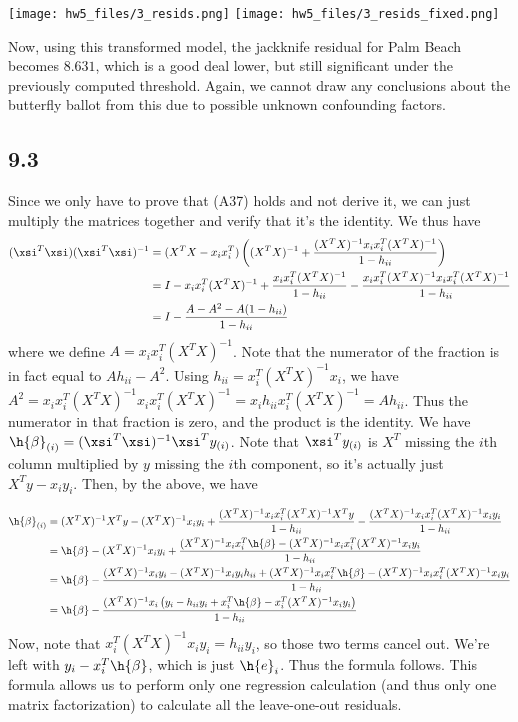 \documentclass{article}
\begin{document}
\texttt{[image: hw5\_files/3\_resids.png]}
\texttt{[image: hw5\_files/3\_resids\_fixed.png]}

Now, using this transformed model, the jackknife residual for Palm Beach becomes $8.631$, which is a good deal lower, but still significant under the previously computed threshold. Again, we cannot draw any conclusions about the butterfly ballot from this due to possible unknown confounding factors.
\subsection*{9.3}
Since we only have to prove that (A37) holds and not derive it, we can just multiply the matrices together and verify that it's the identity. We thus have
\begin{align*}
    (\xsi^T\xsi)(\xsi^T\xsi)^{-1}&=(X^TX-x_ix_i^T)\left((X^TX)^{-1}+\frac{(X^TX)^{-1}x_ix_i^T(X^TX)^{-1}}{1-h_{ii}}\right)\\
                                 &=I-x_ix_i^T(X^TX)^{-1}+\frac{x_ix_i^T(X^TX)^{-1}}{1-h_{ii}}-\frac{x_ix_i^T(X^TX)^{-1}x_ix_i^T(X^TX)^{-1}}{1-h_{ii}}\\
                                 &=I-\frac{A-A^2-A(1-h_{ii})}{1-h_{ii}}\\
\end{align*}
where we define $A=x_ix_i^T(X^TX)^{-1}$. Note that the numerator of the fraction is in fact equal to $Ah_{ii}-A^2$. Using $h_{ii}=x_i^T(X^TX)^{-1}x_i$, we have $A^2=x_ix_i^T(X^TX)^{-1}x_ix_i^T(X^TX)^{-1}=x_ih_{ii}x_i^T(X^TX)^{-1}=Ah_{ii}$. Thus the numerator in that fraction is zero, and the product is the identity.
We have $\h{\beta}_{(i)}=(\xsi^T\xsi)^{-1}\xsi^Ty_{(i)}$. Note that $\xsi^Ty_{(i)}$ is $X^T$ missing the $i$th column multiplied by $y$ missing the $i$th component, so it's actually just $X^Ty-x_iy_i$. Then, by the above, we have 

\begin{align*}
    \h{\beta}_{(i)}&=(X^TX)^{-1}X^Ty-(X^TX)^{-1}x_iy_i+\frac{(X^TX)^{-1}x_ix_i^T(X^TX)^{-1}X^Ty}{1-h_{ii}}-\frac{(X^TX)^{-1}x_ix_i^T(X^TX)^{-1}x_iy_i}{1-h_{ii}}\\
             &=\h{\beta}-(X^TX)^{-1}x_iy_i+\frac{(X^TX)^{-1}x_ix_i^T\h{\beta}-(X^TX)^{-1}x_ix_i^T(X^TX)^{-1}x_iy_i}{1-h_{ii}}\\
             &=\h{\beta}-\frac{(X^TX)^{-1}x_iy_i-(X^TX)^{-1}x_iy_ih_{ii}+(X^TX)^{-1}x_ix_i^T\h{\beta}-(X^TX)^{-1}x_ix_i^T(X^TX)^{-1}x_iy_i}{1-h_{ii}}\\
             &=\h{\beta}-\frac{(X^TX)^{-1}x_i\left(y_i-h_{ii}y_i+x_i^T\h{\beta}-x_i^T(X^TX)^{-1}x_iy_i\right)}{1-h_{ii}}\\
\end{align*}
Now, note that $x_i^T(X^TX)^{-1}x_iy_i=h_{ii}y_i$, so those two terms cancel out. We're left with $y_i-x_i^T\h{\beta}$, which is just $\h{e}_i$. Thus the formula follows. This formula allows us to perform only one regression calculation (and thus only one matrix factorization) to calculate all the leave-one-out residuals.
\end{document}
